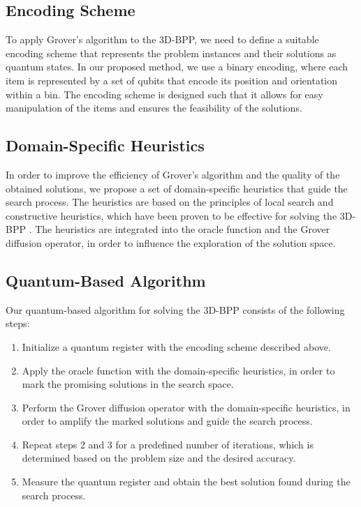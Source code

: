 \subsection{Encoding Scheme}

To apply Grover's algorithm to the 3D-BPP, we need to define a suitable encoding scheme that represents the problem instances and their solutions as quantum states. In our proposed method, we use a binary encoding, where each item is represented by a set of qubits that encode its position and orientation within a bin. The encoding scheme is designed such that it allows for easy manipulation of the items and ensures the feasibility of the solutions.

\subsection{Domain-Specific Heuristics}

In order to improve the efficiency of Grover's algorithm and the quality of the obtained solutions, we propose a set of domain-specific heuristics that guide the search process. The heuristics are based on the principles of local search and constructive heuristics, which have been proven to be effective for solving the 3D-BPP \cite{1}. The heuristics are integrated into the oracle function and the Grover diffusion operator, in order to influence the exploration of the solution space.

\subsection{Quantum-Based Algorithm}

Our quantum-based algorithm for solving the 3D-BPP consists of the following steps:

\begin{enumerate}
    \item Initialize a quantum register with the encoding scheme described above.
    
    \item Apply the oracle function with the domain-specific heuristics, in order to mark the promising solutions in the search space.
    
    \item Perform the Grover diffusion operator with the domain-specific heuristics, in order to amplify the marked solutions and guide the search process.
    
    \item Repeat steps 2 and 3 for a predefined number of iterations, which is determined based on the problem size and the desired accuracy.
    
    \item Measure the quantum register and obtain the best solution found during the search process.
\end{enumerate}

